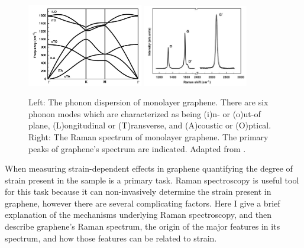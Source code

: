 \documentclass[edeposit,fullpage,draftthesis]{uiucthesis2009}
\begin{document}
            \begin{figure}
            \centering
            \includegraphics[width=0.45\textwidth]{images/background/graphene_phonons.png}
            \includegraphics[width=0.41\textwidth]{images/background/graphene_raman2.png}
            \caption[Phonon dispersion and Raman spectrum of monolayer graphene]{
            Left: The phonon dispersion of monolayer graphene. There are six phonon modes which
            are characterized as being (i)n- or (o)ut-of plane, (L)ongitudinal or (T)ransverse,
            and (A)coustic or (O)ptical.
            Right: The Raman spectrum of monolayer graphene. The primary peaks of graphene's spectrum are indicated.
            Adapted from \cite{malard2009raman}.
            }
            \label{fig:graphene_raman}
            \end{figure}
       
        When measuring strain-dependent effects in graphene quantifying the degree of strain present in 
        the sample is a primary task. Raman spectroscopy is useful tool for this task because it can
        non-invasively determine the strain present in graphene, however there are several complicating factors.
        Here I give a brief explanation of the mechanisms underlying Raman spectroscopy, and then
        describe graphene's Raman spectrum, the origin of the major features in its spectrum,
        and how those features can be related to strain.
        
\end{document}
